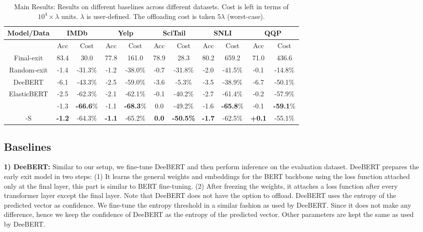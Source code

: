 \begin{table*}[]
\caption{Main Results: Results on different baselines across different datasets. Cost is left in terms of $10^{4}\times \lambda$ units. $\lambda$ is user-defined. The offloading cost is taken 5$\lambda$ (worst-case).}
\label{tab: Results}
\begin{tabular}{ccccccccccc}
\hline
Model/Data  & \multicolumn{2}{c}{IMDb}         & \multicolumn{2}{c}{Yelp} & \multicolumn{2}{c}{SciTail} & \multicolumn{2}{c}{SNLI} & \multicolumn{2}{c}{QQP} \\ \hline
            & Acc           & Cost             & Acc            & Cost    & Acc             & Cost      & Acc            & Cost    & Acc           & Cost    \\ \hline
Final-exit  & 83.4          & 30.0             & 77.8           & 161.0   & 78.9            & 28.3      & 80.2           & 659.2   & 71.0          & 436.6   \\
Random-exit & -1.4          & -31.3\%          & -1.2  & -38.0\% & -0.7            & -31.8\%   & -2.0           & -41.5\% & -0.1          & -14.8\% \\
DeeBERT     & -6.1          & -43.3\%          & -2.5           & -59.0\% & -3.6            & -5.3\%    & -3.5           & -38.9\% & -6.7          & -50.1\% \\
ElasticBERT & -2.5          & -62.3\%          & -2.1           & -62.1\% & -0.1            & -40.2\%   & -2.7           & -61.4\% & -0.2          & -57.9\% \\
\our{} & -1.3 & \textbf{-66.6}\% & -1.1 & \textbf{-68.3}\% & 0.0 & -49.2\% & -1.6 & \textbf{-65.8}\% & -0.1 & \textbf{-59.1}\%\\
\our{}-S  & \textbf{-1.2} & -64.3\% & \textbf{-1.1}           & -65.2\% & \textbf{0.0}    & \textbf{-50.5\%}   & \textbf{-1.7}  & -62.5\% & \textbf{+0.1}  & -55.1\% \\ \hline
\end{tabular}
\end{table*}


\subsection{Baselines}
    \textbf{1) DeeBERT:} Similar to our setup, we fine-tune DeeBERT and then perform inference on the evaluation dataset.
    DeeBERT prepares the early exit model in two steps: (1) It learns the general weights and embeddings for the BERT backbone using the loss function attached only at the final layer, this part is similar to BERT fine-tuning. (2) After freezing the weights, it attaches a loss function after every transformer layer except the final layer. Note that DeeBERT does not have the option to offload. DeeBERT uses the entropy of the predicted vector as confidence. We fine-tune the entropy threshold in a similar fashion as used by DeeBERT. Since it does not make any difference, hence we keep the confidence of DeeBERT as the entropy of the predicted vector. Other parameters are kept the same as used by DeeBERT.


